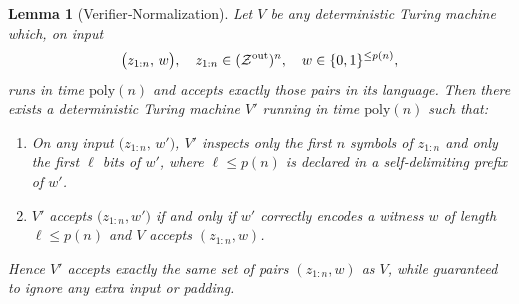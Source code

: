 \documentclass[12pt]{article}
\theoremstyle{definition}
\theoremstyle{plain}
\newtheorem{lemma}{Lemma}[section]
\begin{document}
\begin{lemma}[Verifier‐Normalization]
\label{lem:verifier-normalization}
Let $V$ be any deterministic Turing machine which, on input
\[
  \bigl(z_{1:n},\,w\bigr),
  \quad
  z_{1:n}\in(\mathcal Z^{\rm out})^n,\quad
  w\in\{0,1\}^{\le p(n)},
\]
runs in time $\mathrm{poly}(n)$ and accepts exactly those pairs in its language.  Then there exists a deterministic Turing machine $V'$ running in time $\mathrm{poly}(n)$ such that:
\begin{enumerate}
  \item On any input $\bigl(z_{1:n},\,w'\bigr)$, $V'$ inspects only the first $n$ symbols of $z_{1:n}$ and only the first $\ell$ bits of $w'$, where $\ell\le p(n)$ is declared in a self‐delimiting prefix of $w'$.
  \item $V'$ accepts $\bigl(z_{1:n},w'\bigr)$ if and only if $w'$ correctly encodes a witness $w$ of length $\ell\le p(n)$ and $V$ accepts $(z_{1:n},w)$.
\end{enumerate}
Hence $V'$ accepts exactly the same set of pairs $(z_{1:n},w)$ as $V$, while guaranteed to ignore any extra input or padding.
\end{lemma}
\end{document}
